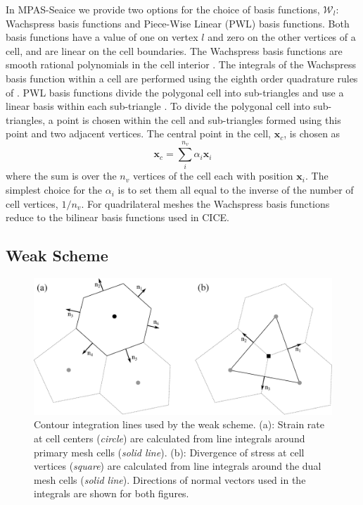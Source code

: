 In MPAS-Seaice we provide two options for the choice of basis functions, $\mathcal{W}_l$: Wachspress basis functions and Piece-Wise Linear (PWL) basis functions. Both basis functions have a value of one on vertex $l$ and zero on the other vertices of a cell, and are linear on the cell boundaries. The Wachspress basis functions are smooth rational polynomials in the cell interior \citep{Dasgupta03}. The integrals of the Wachspress basis function within a cell are performed using the eighth order quadrature rules of \citet{Dunavant85}. PWL basis functions divide the polygonal cell into sub-triangles and use a linear basis within each sub-triangle \citep{Bailey08}. To divide the polygonal cell into sub-triangles, a point is chosen within the cell and sub-triangles formed using this point and two adjacent vertices. The central point in the cell, $\mathbf{x}_c$,  is chosen as
\begin{equation}
\mathbf{x}_c = \sum_i^{n_v} \alpha_i \mathbf{x}_i
\end{equation}
where the sum is over the $n_v$ vertices of the cell each with position $\mathbf{x}_i$. The simplest choice for the $\alpha_i$ is to set them all equal to the inverse of the number of cell vertices, $1/n_v$. For quadrilateral meshes the Wachspress basis functions reduce to the bilinear basis functions used in CICE.

\subsection{Weak Scheme}

\begin{figure}[]
\centering
\includegraphics[width=\linewidth]{seaice/figures/mesh_weak.eps}
\caption{Contour integration lines used by the weak scheme. (a): Strain rate at cell centers (\emph{circle}) are calculated from line integrals around primary mesh cells (\emph{solid line}). (b): Divergence of stress at cell vertices (\emph{square}) are calculated from line integrals around the dual mesh cells (\emph{solid line}). Directions of normal vectors used in the integrals are shown for both figures.}
\label{fig:mesh_weak}
\end{figure}

